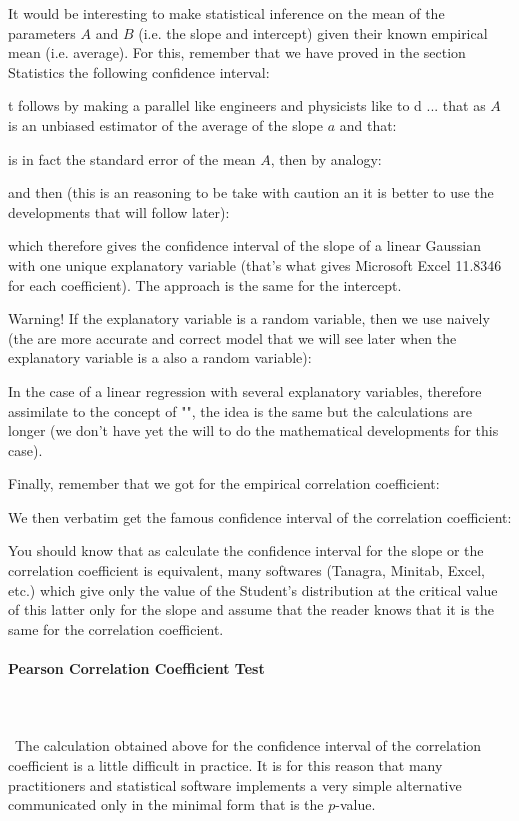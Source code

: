 	It would be interesting to make statistical inference on the mean of the parameters $A$ and $B$ (i.e. the slope and intercept) given their known empirical mean (i.e. average). For this, remember that we have proved in the section Statistics the following confidence interval:
	
	t follows by making a parallel like engineers and physicists like to d ... that as $A$ is an unbiased estimator of the average of the slope $a$ and that:
	
	is in fact the standard error of the mean $A$, then by analogy:
	
	and then (this is an reasoning to be take with caution an it is better to use the developments that will follow later):
	
	which therefore gives the confidence interval of the slope of a linear Gaussian with one unique explanatory variable (that's what gives Microsoft Excel 11.8346 for each coefficient). The approach is the same for the intercept.
	
	Warning! If the explanatory variable is a random variable, then we use naively (the are more accurate and correct model that we will see later when the explanatory variable is a also a random variable):
	
	
	In the case of a linear regression with several explanatory variables, therefore assimilate to the concept of "", the idea is the same but the calculations are longer (we don't have yet the will to do the mathematical developments for this case).
	
	Finally, remember that we got for the empirical correlation coefficient:
	
	We then verbatim get the famous confidence interval of the correlation coefficient:
	
	You should know that as calculate the confidence interval for the slope or the correlation coefficient is equivalent, many softwares (Tanagra, Minitab, Excel, etc.) which give only the value of the Student's distribution at the critical value of this latter only for the slope and assume that the reader knows that it is the same for the correlation coefficient.
	
	\paragraph{Pearson Correlation Coefficient Test}\mbox{}\\\\\
	The calculation obtained above for the confidence interval of the correlation coefficient is a little difficult in practice. It is for this reason that many practitioners and statistical software implements a very simple alternative communicated only in the minimal form that is the $p$-value.
	
